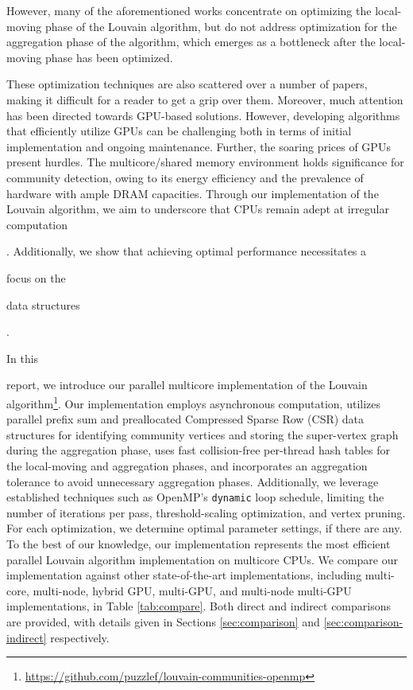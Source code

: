 However, many of the aforementioned works concentrate on optimizing the local-moving phase of the Louvain algorithm, but do not address optimization for the aggregation phase of the algorithm, which emerges as a bottleneck after the local-moving phase has been optimized. These optimization techniques are also scattered over a number of papers, making it difficult for a reader to get a grip over them. Moreover, much attention has been directed towards GPU-based solutions. However, developing algorithms that efficiently utilize GPUs can be challenging both in terms of initial implementation and ongoing maintenance. Further, the soaring prices of GPUs present hurdles. The multicore/shared memory environment holds significance for community detection, owing to its energy efficiency and the prevalence of hardware with ample DRAM capacities. Through our implementation of the Louvain algorithm, we aim to underscore that CPUs remain adept at irregular computation. Additionally, we show that achieving optimal performance necessitates a focus on the data structures.


In this report, we introduce our parallel multicore implementation of the Louvain algorithm\footnote{\url{https://github.com/puzzlef/louvain-communities-openmp}}. Our implementation employs asynchronous computation, utilizes parallel prefix sum and preallocated Compressed Sparse Row (CSR) data structures for identifying community vertices and storing the super-vertex graph during the aggregation phase, uses fast collision-free per-thread hash tables for the local-moving and aggregation phases, and incorporates an aggregation tolerance to avoid unnecessary aggregation phases. Additionally, we leverage established techniques such as OpenMP's \verb|dynamic| loop schedule, limiting the number of iterations per pass, threshold-scaling optimization, and vertex pruning. For each optimization, we determine optimal parameter settings, if there are any. To the best of our knowledge, our implementation represents the most efficient parallel Louvain algorithm implementation on multicore CPUs. We compare our implementation against other state-of-the-art implementations, including multi-core, multi-node, hybrid GPU, multi-GPU, and multi-node multi-GPU implementations, in Table \ref{tab:compare}. Both direct and indirect comparisons are provided, with details given in Sections \ref{sec:comparison} and \ref{sec:comparison-indirect} respectively.

